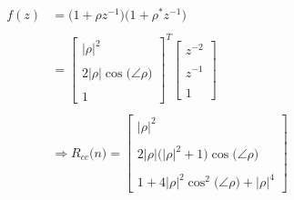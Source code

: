 \documentclass{article}
\begin{document}
\begin{align*}
    f(z)&= \big(1 + \rho z^{-1}\big)\big(1 + \rho^{*}z^{-1}\big) \\ \\
        &= \begin{bmatrix}
                \big|\rho\big|^{2} \\ \\
                2\big|\rho\big|\cos\big(\angle{\rho}\big) \\ \\
                1
             \end{bmatrix}^{T}
           \begin{bmatrix}
                z^{-2} \\ \\
                z^{-1} \\ \\
                1
             \end{bmatrix} \\ \\
    &\Rightarrow R_{cc}\big(n\big) = \begin{bmatrix}
                                        \big|\rho\big|^{2} \\ \\
                                        2\big|\rho\big|\Big(\big|\rho\big|^{2} + 1\Big)\cos\big(\angle{\rho}\big) \\ \\
                                        1 + 4\big|\rho\big|^{2}\cos^{2}\big(\angle{\rho}\big) + \big|\rho\big|^{4}
                                       \end{bmatrix}
\end{align*}
\end{document}
